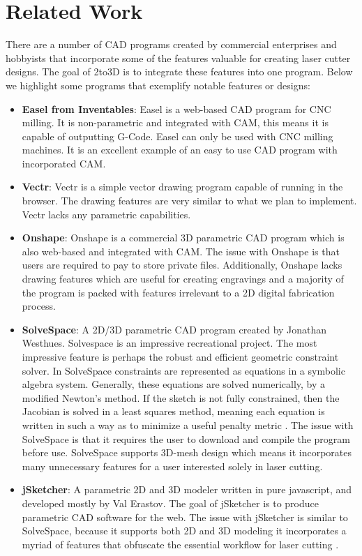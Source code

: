 
\section{Related Work}

There are a number of CAD programs created by commercial enterprises and hobbyists that incorporate some of the features valuable for creating laser cutter designs. The goal of 2to3D is to integrate these features into one program. Below we highlight some programs that exemplify notable features or designs:

\begin{itemize}
  \item \textbf{Easel from Inventables}: Easel is a web-based CAD program for CNC milling. It is non-parametric and integrated with CAM, this means it is capable of outputting G-Code. Easel can only be used with CNC milling machines. It is an excellent example of an easy to use CAD program with incorporated CAM.
  \item \textbf{Vectr}: Vectr is a simple vector drawing program capable of running in the browser. The drawing features are very similar to what we plan to implement. Vectr lacks any parametric capabilities.
  \item \textbf{Onshape}: Onshape is a commercial 3D parametric CAD program which is also web-based and integrated with CAM. The issue with Onshape is that users are required to pay to store private files. Additionally, Onshape lacks drawing features which are useful for creating engravings and a majority of the program is packed with features irrelevant to a 2D digital fabrication process.
  \item \textbf{SolveSpace}: A 2D/3D parametric CAD program created by Jonathan Westhues. Solvespace is an impressive recreational project. The most impressive feature is perhaps the robust and efficient geometric constraint solver. In SolveSpace constraints are represented as equations in a symbolic algebra system. Generally, these equations are solved numerically, by a modified Newton's method. If the sketch is not fully constrained, then the Jacobian is solved in a least squares method, meaning each equation is written in such a way as to minimize a useful penalty metric \cite{solvespace} \cite{solvespace2}. The issue with SolveSpace is that it requires the user to download and compile the program before use. SolveSpace supports 3D-mesh design which means it incorporates many unnecessary features for a user interested solely in laser cutting.
  \item \textbf{jSketcher}: A parametric 2D and 3D modeler written in pure javascript, and developed mostly by Val Erastov. The goal of jSketcher is to produce parametric CAD software for the web. The issue with jSketcher is similar to SolveSpace, because it supports both 2D and 3D modeling it incorporates a myriad of features that obfuscate the essential workflow for laser cutting \cite{jsketcher}.
\end{itemize}

